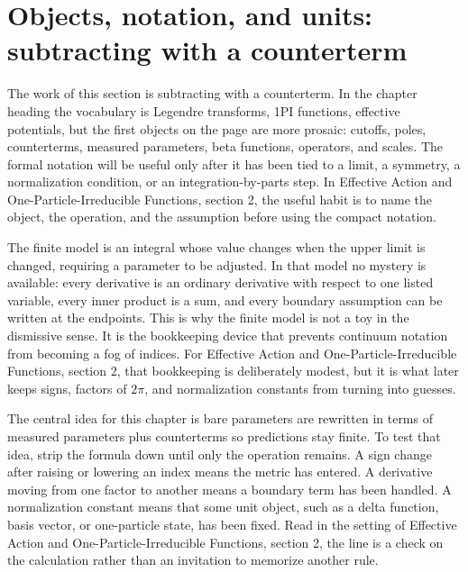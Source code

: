 \section{Objects, notation, and units: subtracting with a counterterm}













The work of this section is subtracting with a counterterm.  In the chapter heading the vocabulary is Legendre transforms, 1PI functions, effective potentials, but the first objects on the page are more prosaic: cutoffs, poles, counterterms, measured parameters, beta functions, operators, and scales.  The formal notation will be useful only after it has been tied to a limit, a symmetry, a normalization condition, or an integration-by-parts step.  In Effective Action and One-Particle-Irreducible Functions, section 2, the useful habit is to name the object, the operation, and the assumption before using the compact notation.

The finite model is an integral whose value changes when the upper limit is changed, requiring a parameter to be adjusted.  In that model no mystery is available: every derivative is an ordinary derivative with respect to one listed variable, every inner product is a sum, and every boundary assumption can be written at the endpoints.  This is why the finite model is not a toy in the dismissive sense.  It is the bookkeeping device that prevents continuum notation from becoming a fog of indices.  For Effective Action and One-Particle-Irreducible Functions, section 2, that bookkeeping is deliberately modest, but it is what later keeps signs, factors of \(2\pi\), and normalization constants from turning into guesses.

The central idea for this chapter is bare parameters are rewritten in terms of measured parameters plus counterterms so predictions stay finite.  To test that idea, strip the formula down until only the operation remains.  A sign change after raising or lowering an index means the metric has entered.  A derivative moving from one factor to another means a boundary term has been handled.  A normalization constant means that some unit object, such as a delta function, basis vector, or one-particle state, has been fixed.  Read in the setting of Effective Action and One-Particle-Irreducible Functions, section 2, the line is a check on the calculation rather than an invitation to memorize another rule.

